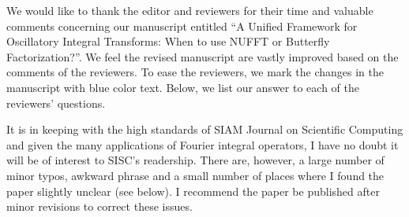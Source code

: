 \documentclass[11pt]{article}
\begin{document}
We would like to thank the editor and reviewers for their time and valuable comments concerning our manuscript entitled ``A Unified Framework for Oscillatory Integral Transforms: When to use NUFFT or Butterfly Factorization?''. We feel the revised manuscript are vastly improved based on the comments of the reviewers. To ease the reviewers, we mark the changes in the manuscript with blue color text. Below, we list our answer to each of the reviewers' questions. 

\vspace{10pt}

 It is in keeping with the high standards of SIAM Journal on Scientific Computing and given the many applications of Fourier integral operators, I have no doubt it will be of interest to SISC's readership. There are, however, a large number of minor typos, awkward phrase and a small number of places where I found the paper slightly unclear (see below). I recommend the paper be published after minor revisions to correct these issues.
\end{document}
